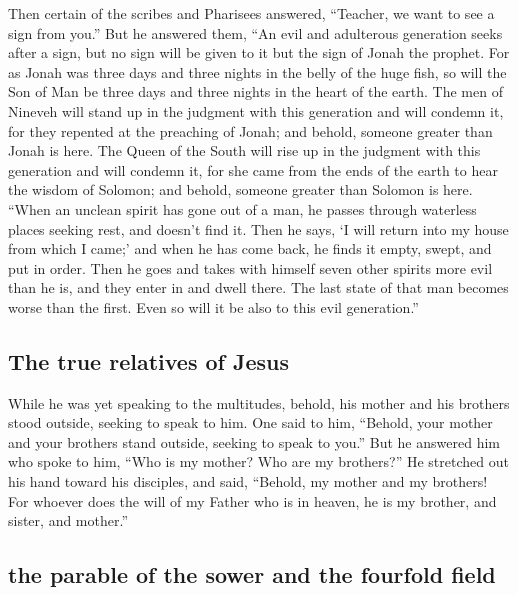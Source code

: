  Then certain of the scribes and Pharisees answered,
``Teacher, we want to see a sign from you.''  But he
answered them, ``An evil and adulterous generation seeks after a sign,
but no sign will be given to it but the sign of Jonah the prophet.
 For as Jonah was three days and three nights in the
belly of the huge fish, so will the Son of Man be three days and three
nights in the heart of the earth.  The men of Nineveh
will stand up in the judgment with this generation and will condemn it,
for they repented at the preaching of Jonah; and behold, someone greater
than Jonah is here.  The Queen of the South will rise up
in the judgment with this generation and will condemn it, for she came
from the ends of the earth to hear the wisdom of Solomon; and behold,
someone greater than Solomon is here.  ``When an unclean
spirit has gone out of a man, he passes through waterless places seeking
rest, and doesn't find it.  Then he says, `I will return
into my house from which I came;' and when he has come back, he finds it
empty, swept, and put in order.  Then he goes and takes
with himself seven other spirits more evil than he is, and they enter in
and dwell there. The last state of that man becomes worse than the
first. Even so will it be also to this evil generation.''

\hypertarget{the-true-relatives-of-jesus}{%
\subsection{The true relatives of
Jesus}\label{the-true-relatives-of-jesus}}

 While he was yet speaking to the multitudes, behold, his
mother and his brothers stood outside, seeking to speak to him.
 One said to him, ``Behold, your mother and your brothers
stand outside, seeking to speak to you.''  But he
answered him who spoke to him, ``Who is my mother? Who are my
brothers?''  He stretched out his hand toward his
disciples, and said, ``Behold, my mother and my brothers!
 For whoever does the will of my Father who is in heaven,
he is my brother, and sister, and mother.''

\hypertarget{the-parable-of-the-sower-and-the-fourfold-field}{%
\subsection{the parable of the sower and the fourfold
field}\label{the-parable-of-the-sower-and-the-fourfold-field}}

